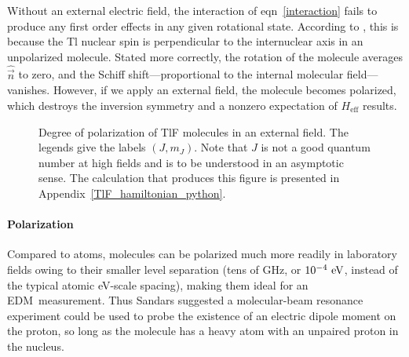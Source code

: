 Without an external electric field, the interaction of eqn~\ref{interaction}
fails to produce any first order effects in any given rotational state.
According to \cite{hinds1980experiment,wilkening1984search}, this is because the
Tl nuclear spin is perpendicular to the internuclear axis in an unpolarized
molecule. Stated more correctly, the rotation of the molecule averages
$\hat{\vec n}$ to zero, and the Schiff shift---proportional to the internal
molecular field---vanishes. \cite{cho1989tenfold, cho1991search} However, if we
apply an external field, the molecule becomes polarized, which destroys the
inversion symmetry and a nonzero expectation of $H_{\text{eff}}$ results.

\begin{figure}
    \def\svgwidth{\columnwidth}
    \makebox[\columnwidth][c]{%
        \footnotesize
        
    }
    \caption[Polarization of TlF molecules in external field.]{Degree of
    polarization of TlF molecules in an external field. The legends give the
    labels $(J,m_J)$. Note that $J$ is not a good quantum number at high fields
    and is to be understood in an asymptotic sense. The calculation that
    produces this figure is presented in Appendix~\ref{TlF_hamiltonian_python}.}
    \label{polarizeTlF}
\end{figure}

\paragraph{Polarization}

Compared to atoms, molecules can be polarized much more readily in laboratory
fields owing to their smaller level separation (tens of GHz, or $10^{-4}~\mathrm{eV}$,
instead of the typical atomic eV-scale spacing), making them ideal for an
\gls{EDM}\ measurement. Thus Sandars \cite{sandars1967measurability} suggested a
molecular-beam resonance experiment could be used to probe the existence of an
electric dipole moment on the proton, so long as the molecule has a heavy atom
with an unpaired proton in the nucleus.


